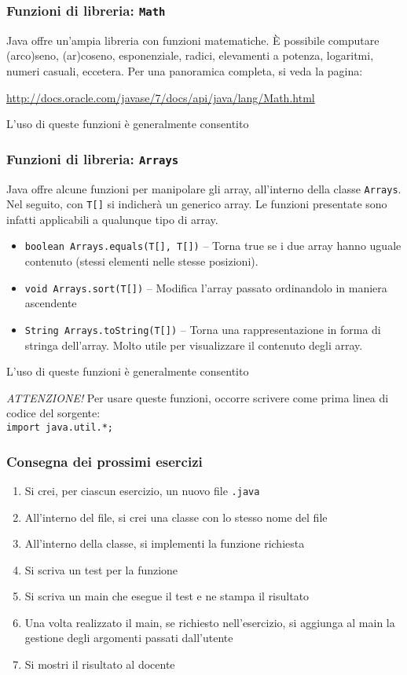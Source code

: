 \documentclass{beamer}
\begin{document}
\begin{frame}[fragile]
\frametitle{Funzioni di libreria: \texttt{Math}}
Java offre un'ampia libreria con funzioni matematiche. È possibile computare (arco)seno, (ar)coseno, esponenziale, radici, elevamenti a potenza, logaritmi, numeri casuali, eccetera. Per una panoramica completa, si veda la pagina:

\scriptsize{}
\url{http://docs.oracle.com/javase/7/docs/api/java/lang/Math.html}

\normalsize{}
L'uso di queste funzioni è generalmente consentito
\end{frame}

\begin{frame}[fragile]
\frametitle{Funzioni di libreria: \texttt{Arrays}}
Java offre alcune funzioni per manipolare gli array, all'interno della classe \texttt{Arrays}. Nel seguito, con \texttt{T[]} si indicherà un generico array. Le funzioni presentate sono infatti applicabili a qualunque tipo di array.
\begin{itemize}
 \item \texttt{boolean Arrays.equals(T[], T[])} -- Torna true se i due array hanno uguale contenuto (stessi elementi nelle stesse posizioni). 
 \item \texttt{void Arrays.sort(T[])} -- Modifica l'array passato ordinandolo in maniera ascendente
 \item \texttt{String Arrays.toString(T[])} -- Torna una rappresentazione in forma di stringa dell'array. Molto utile per visualizzare il contenuto degli array.
\end{itemize}
L'uso di queste funzioni è generalmente consentito

\emph{ATTENZIONE!} Per usare queste funzioni, occorre scrivere come prima linea di codice del sorgente:\\
\texttt{import java.util.*;}\\
\end{frame}

\begin{frame}[fragile]
\frametitle{Consegna dei prossimi esercizi}
\begin{enumerate}
 \item Si crei, per ciascun esercizio, un nuovo file \texttt{.java}
 \item All'interno del file, si crei una classe con lo stesso nome del file
 \item All'interno della classe, si implementi la funzione richiesta
 \item Si scriva un test per la funzione
 \item Si scriva un main che esegue il test e ne stampa il risultato
 \item Una volta realizzato il main, se richiesto nell'esercizio, si aggiunga al main la gestione degli argomenti passati dall'utente
 \item Si mostri il risultato al docente
\end{enumerate}
\end{frame}
\end{document}

